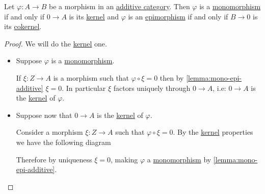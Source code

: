 \documentclass[../../../main]{subfiles}
\begin{document}
\begin{lemma} \label{lemma:partial-sequence-additive}
  Let \(\varphi: A \to B\) be a morphism in an \hyperref[def:additive-category]{additive category}. Then \(\varphi\) is a \hyperref[def:mono-epi-morphism]{monomorphism} if and only if \(0 \to A\) is its \hyperref[def:categorical-kernel]{kernel} and \(\varphi\) is an \hyperref[def:mono-epi-morphism]{epimorphism} if and only if \(B \to 0\) is its \hyperref[def:categorical-cokernel]{cokernel}.
\end{lemma}
\begin{proof}
  We will do the \hyperref[def:categorical-kernel]{kernel} one.
  \begin{itemize}
    \item[\(\implies\)] Suppose \(\varphi\) is a \hyperref[def:mono-epi-morphism]{monomorphism}.

          If \(\xi: Z \to A\) is a morphism such that \(\varphi \circ \xi = 0\) then by \autoref{lemma:mono-epi-additive} \(\xi = 0\).
          In particular \(\xi\) factors uniquely through \(0 \to A\), i.e: \(0 \to A\) is the \hyperref[def:categorical-kernel]{kernel} of \(\varphi\).
    \item[\(\impliedby\)] Suppose now that \(0 \to A\) is the \hyperref[def:categorical-kernel]{kernel} of \(\varphi\).

          Consider a morphism \(\xi: Z \to A\) such that \(\varphi \circ \xi = 0\).
          By the \hyperref[def:categorical-kernel]{kernel} properties we have the following diagram
          \begin{center}
          \end{center}
          Therefore by uniqueness \(\xi = 0\), making \(\varphi\) a \hyperref[def:mono-epi-morphism]{monomorphism} by \autoref{lemma:mono-epi-additive}.
  \end{itemize}
\end{proof}
\end{document}
